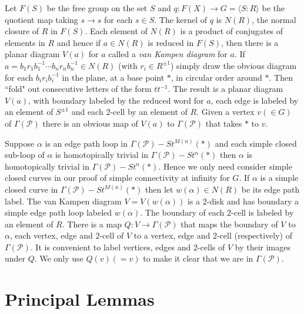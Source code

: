 \documentclass[12pt]{article}
\numberwithin{equation}{section}
\begin{document}
 Let $F(S)$ be the free group on the set $S$ and $q:F(X)\to G=\langle S:R\rangle$ be the quotient map taking $s\to s$ for each $s\in S$. The kernel of $q$ is $N(R)$, the normal closure of $R$ in $F(S)$. Each element of $N(R)$ is a product of conjugates of elements in $R$ and hence if $a\in N(R)$ is reduced in $F(S)$, then there is a planar diagram $V(a)$ for $a$ called a {\it van Kampen diagram} for $a$. If $a=b_1r_1b_1^{-1}\cdots b_nr_nb_n^{-1}\in N(R)$ (with $r_i\in R^{\pm1}$) simply draw the obvious diagram for each  $b_ir_ib_i^{-1}$ in the plane, at a base point $\ast$, in circular order around $\ast$. Then ``fold" out consecutive letters of the form $tt^{-1}$. The result is a planar diagram $V(a)$, with boundary labeled by the reduced word for $a$, each edge is labeled by an element of $S^{\pm1}$ and each 2-cell by an element of $R$. Given a vertex $v(\in G)$ of $\Gamma(\mathcal P)$ there is an obvious map of $V(a)$ to $\Gamma(\mathcal P)$ that takes $\ast$ to $v$. 
 
 Suppose $\alpha$ is an edge path loop in $\Gamma(\mathcal P)-St^{M(n)}(\ast)$ and each simple closed sub-loop of $\alpha$ is homotopically trivial in $\Gamma(\mathcal P)-St^n(\ast)$ then $\alpha$ is homotopically trivial in $\Gamma(\mathcal P)-St^n(\ast)$. Hence we only need consider simple closed curves in our proof of simple connectivity at infinity for $G$. If $\alpha$ is a simple closed curve in  $\Gamma(\mathcal P)-St^{M(n)}(\ast)$ then let $w(\alpha)\in N(R)$ be its edge path label. The van Kampen diagram $V=V(w(\alpha))$ is a 2-disk and has boundary a simple edge path loop labeled $w(\alpha)$. The boundary of each 2-cell is labeled by an element of $R$. There is a map $Q:V\to \Gamma(\mathcal P)$ that maps the boundary of $V$ to $\alpha$, each vertex, edge and 2-cell of $V$ to a vertex, edge and 2-cell (respectively) of $\Gamma(\mathcal P)$. It is convenient to label vertices, edges and 2-cells of $V$ by their images under $Q$. We only use $Q(v)(=v)$ to make it clear that we are in $\Gamma(\mathcal P)$. 
 
  
 \section{Principal Lemmas}\label{PL}
\end{document}
